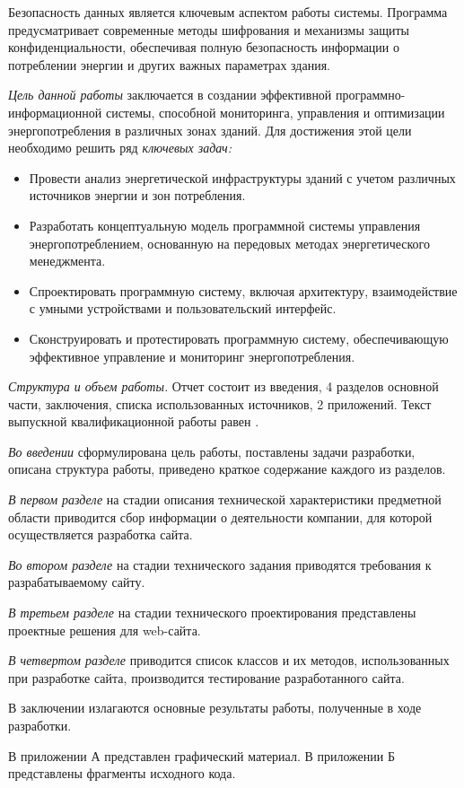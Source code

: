 Безопасность данных является ключевым аспектом работы системы. Программа предусматривает современные методы шифрования и механизмы защиты конфиденциальности, обеспечивая полную безопасность информации о потреблении энергии и других важных параметрах здания.

\emph{Цель данной работы} заключается в создании эффективной программно-информационной системы, способной мониторинга, управления и оптимизации энергопотребления в различных зонах зданий. Для достижения этой цели необходимо решить ряд\emph{ ключевых задач:}
\begin{itemize}
	\item Провести анализ энергетической инфраструктуры зданий с учетом различных источников энергии и зон потребления.
	\item Разработать концептуальную модель программной системы управления энергопотреблением, основанную на передовых методах энергетического менеджмента.
	\item Спроектировать программную систему, включая архитектуру, взаимодействие с умными устройствами и пользовательский интерфейс.
	\item Сконструировать и протестировать программную систему, обеспечивающую эффективное управление и мониторинг энергопотребления.
\end{itemize}

\emph{Структура и объем работы.} Отчет состоит из введения, 4 разделов основной части, заключения, списка использованных источников, 2 приложений. Текст выпускной квалификационной работы равен .

\emph{Во введении} сформулирована цель работы, поставлены задачи разработки, описана структура работы, приведено краткое содержание каждого из разделов.

\emph{В первом разделе} на стадии описания технической характеристики предметной области приводится сбор информации о деятельности компании, для которой осуществляется разработка сайта.

\emph{Во втором разделе} на стадии технического задания приводятся требования к разрабатываемому сайту.

\emph{В третьем разделе} на стадии технического проектирования представлены проектные решения для web-сайта.

\emph{В четвертом разделе} приводится список классов и их методов, использованных при разработке сайта, производится тестирование разработанного сайта.

В заключении излагаются основные результаты работы, полученные в ходе разработки.

В приложении А представлен графический материал.
В приложении Б представлены фрагменты исходного кода. 
